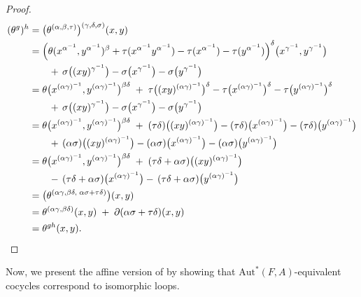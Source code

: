 \documentclass[12pt,a4paper]{amsart}
\theoremstyle{definition}
\begin{document}
\begin{proof}
\begin{align*}
(\theta^{g})^{h}
&=
\bigl(\theta^{(\alpha,\beta,\tau)}\bigr)^{(\gamma,\delta,\sigma)}(x,y)
\\
&=
\Bigl(
 \theta(x^{\alpha^{-1}},y^{\alpha^{-1}})^{\beta}
 + \tau(x^{\alpha^{-1}} y^{\alpha^{-1}})
 - \tau(x^{\alpha^{-1}})
 - \tau(y^{\alpha^{-1}})
\Bigr)^{\delta}
\bigl(x^{\gamma^{-1}},y^{\gamma^{-1}}\bigr)
\\
&\qquad
+\,\sigma\bigl((xy)^{\gamma^{-1}}\bigr)
- \sigma\bigl(x^{\gamma^{-1}}\bigr)
- \sigma\bigl(y^{\gamma^{-1}}\bigr)
\\
&=
\theta\bigl(x^{(\alpha\gamma)^{-1}},y^{(\alpha\gamma)^{-1}}\bigr)^{\beta\delta}
\;+\;
\tau\bigl((xy)^{(\alpha\gamma)^{-1}}\bigr)^{\delta}
- \tau\bigl(x^{(\alpha\gamma)^{-1}}\bigr)^{\delta}
- \tau\bigl(y^{(\alpha\gamma)^{-1}}\bigr)^{\delta}
\\
&\qquad
+\,\sigma\bigl((xy)^{\gamma^{-1}}\bigr)
- \sigma\bigl(x^{\gamma^{-1}}\bigr)
- \sigma\bigl(y^{\gamma^{-1}}\bigr)
\\
&=
\theta\bigl(x^{(\alpha\gamma)^{-1}},y^{(\alpha\gamma)^{-1}}\bigr)^{\beta\delta}
\;+\;
(\tau\delta)\bigl((xy)^{(\alpha\gamma)^{-1}}\bigr)
- (\tau\delta)\bigl(x^{(\alpha\gamma)^{-1}}\bigr)
- (\tau\delta)\bigl(y^{(\alpha\gamma)^{-1}}\bigr)
\\
&\qquad
+\,(\alpha\sigma)\bigl((xy)^{(\alpha\gamma)^{-1}}\bigr)
- (\alpha\sigma)\bigl(x^{(\alpha\gamma)^{-1}}\bigr)
- (\alpha\sigma)\bigl(y^{(\alpha\gamma)^{-1}}\bigr)
\\
&=
\theta\bigl(x^{(\alpha\gamma)^{-1}},y^{(\alpha\gamma)^{-1}}\bigr)^{\beta\delta}
\;+\;
(\tau\delta + \alpha\sigma)\bigl((xy)^{(\alpha\gamma)^{-1}}\bigr)
\\
&\qquad
-\,
(\tau\delta + \alpha\sigma)\bigl(x^{(\alpha\gamma)^{-1}}\bigr)
-\,
(\tau\delta + \alpha\sigma)\bigl(y^{(\alpha\gamma)^{-1}}\bigr)
\\
&=
\bigl(\theta^{(\alpha\gamma,\beta\delta,\;\alpha\sigma+\tau\delta)}\bigr)(x,y)
\\
&=
\theta^{(\alpha\gamma,\beta\delta)}(x,y)
\;+\;
\partial(\alpha\sigma+\tau\delta)(x,y)
\\
&=
\theta^{gh}(x,y). \qedhere
\end{align*}
\end{proof}

Now, we present the affine version of \cite[Lemma 3.1]{DalyVojtechovsky2009} by showing that $\mathrm{Aut}^{\!*}(F,A)$-equivalent cocycles correspond to isomorphic loops. 
\end{document}
